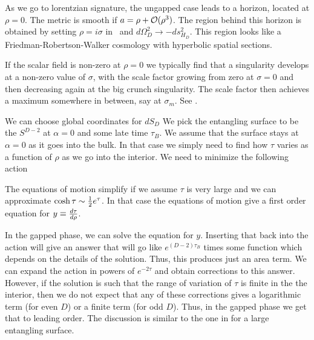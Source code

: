 As we go to lorentzian signature, the ungapped case leads to a horizon, located at $\rho=0$.
 The metric is smooth if $a= \rho + {\cal O}(\rho^3)$. The region behind this horizon is obtained by
 setting $\rho = i \sigma$ in \metrpro\ and $d\Omega_D^2 \to - ds^2_{H_D}$.
This region looks like a Friedman-Robertson-Walker cosmology with hyperbolic spatial sections.

\eqn{}
If the scalar
field is non-zero at $\rho=0$ we typically find that a singularity develops at a non-zero value of $\sigma$,
with the scale factor growing from zero at $\sigma =0$ and then decreasing again at the big crunch singularity. The scale factor then achieves a maximum somewhere in between, say at $\sigma_m$. See \scfac .


 We can choose
global coordinates for $dS_D$
\eqn{}
We pick the entangling surface to be the $S^{D-2}$ at $\alpha =0$ and some late time $\tau_B$.
We assume that the surface stays at $\alpha =0$ as it goes into the bulk. In that case
we simply need to find  how $\tau$ varies as a function of $\rho$ as we go into the interior.
We need to minimize the following action
\eqn{}

The equations of motion simplify if we assume $\tau$ is very large and we can approximate
$\cosh \tau \sim {1\over 2 } e^{ \tau }$. In that case the equations of motion give
a first order equation for $y \equiv  { d \tau \over d \rho }$.




In the gapped phase, we can solve the equation for $y$. Inserting that back into the action will
give an answer that will go like $e^{ (D-2) \tau_B}$ times some function which depends on the details of the
solution. Thus, this produces just an area term. We can expand the action in powers of $e^{ - 2 \tau}$ and
obtain corrections to this answer. However, if the solution is such that the range of variation of $\tau$ is finite in the the interior, then
we do not expect that any of these corrections gives a logarithmic term (for even $D$) or a finite
term (for odd $D$).
Thus, in the gapped phase we get that
\eqn{}
to leading order. The discussion is similar to the one in  for a large entangling surface.

